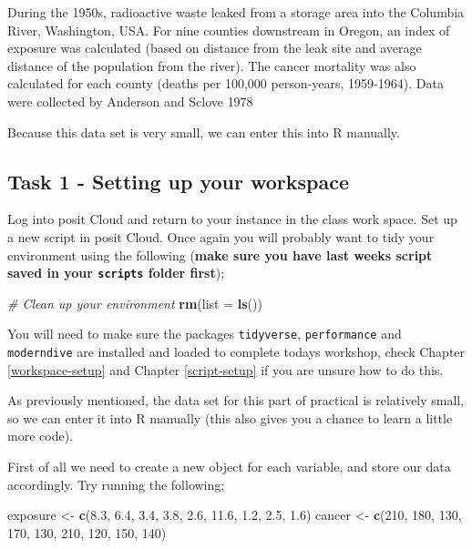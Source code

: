 \documentclass[
]{book}
\newenvironment{Shaded}{\begin{snugshade}}{\end{snugshade}}
\newcommand{\AttributeTok}[1]{\textcolor[rgb]{0.13,0.29,0.53}{#1}}
\newcommand{\CommentTok}[1]{\textcolor[rgb]{0.56,0.35,0.01}{\textit{#1}}}
\newcommand{\DecValTok}[1]{\textcolor[rgb]{0.00,0.00,0.81}{#1}}
\newcommand{\FloatTok}[1]{\textcolor[rgb]{0.00,0.00,0.81}{#1}}
\newcommand{\FunctionTok}[1]{\textcolor[rgb]{0.13,0.29,0.53}{\textbf{#1}}}
\newcommand{\NormalTok}[1]{#1}
\newcommand{\OtherTok}[1]{\textcolor[rgb]{0.56,0.35,0.01}{#1}}
\begin{document}
During the 1950s, radioactive waste leaked from a storage area into the Columbia River, Washington, USA. For nine counties downstream in Oregon, an index of exposure was calculated (based on distance from the leak site and average distance of the population from the river). The cancer mortality was also calculated for each county (deaths per 100,000 person-years, 1959-1964). Data were collected by Anderson and Sclove 1978

Because this data set is very small, we can enter this into R manually.

\hypertarget{manual-data-entry}{%
\subsection{Task 1 - Setting up your workspace}\label{manual-data-entry}}

Log into posit Cloud and return to your instance in the class work space. Set up a new script in posit Cloud. Once again you will probably want to tidy your environment using the following (\textbf{make sure you have last weeks script saved in your \texttt{scripts} folder first});

\begin{Shaded}
\begin{Highlighting}[]
\CommentTok{\# Clean up your environment}
\FunctionTok{rm}\NormalTok{(}\AttributeTok{list =} \FunctionTok{ls}\NormalTok{())}
\end{Highlighting}
\end{Shaded}

You will need to make sure the packages \texttt{tidyverse}, \texttt{performance} and \texttt{moderndive} are installed and loaded to complete todays workshop, check Chapter \ref{workspace-setup} and Chapter \ref{script-setup} if you are unsure how to do this.

As previously mentioned, the data set for this part of practical is relatively small, so we can enter it into R manually (this also gives you a chance to learn a little more code).

First of all we need to create a new object for each variable, and store our data accordingly. Try running the following;

\begin{Shaded}
\begin{Highlighting}[]
\NormalTok{exposure }\OtherTok{\textless{}{-}} \FunctionTok{c}\NormalTok{(}\FloatTok{8.3}\NormalTok{, }\FloatTok{6.4}\NormalTok{, }\FloatTok{3.4}\NormalTok{, }\FloatTok{3.8}\NormalTok{, }\FloatTok{2.6}\NormalTok{, }\FloatTok{11.6}\NormalTok{, }\FloatTok{1.2}\NormalTok{, }\FloatTok{2.5}\NormalTok{, }\FloatTok{1.6}\NormalTok{)}
\NormalTok{cancer }\OtherTok{\textless{}{-}} \FunctionTok{c}\NormalTok{(}\DecValTok{210}\NormalTok{, }\DecValTok{180}\NormalTok{, }\DecValTok{130}\NormalTok{, }\DecValTok{170}\NormalTok{, }\DecValTok{130}\NormalTok{, }\DecValTok{210}\NormalTok{, }\DecValTok{120}\NormalTok{, }\DecValTok{150}\NormalTok{, }\DecValTok{140}\NormalTok{)}
\end{Highlighting}
\end{Shaded}
\end{document}
